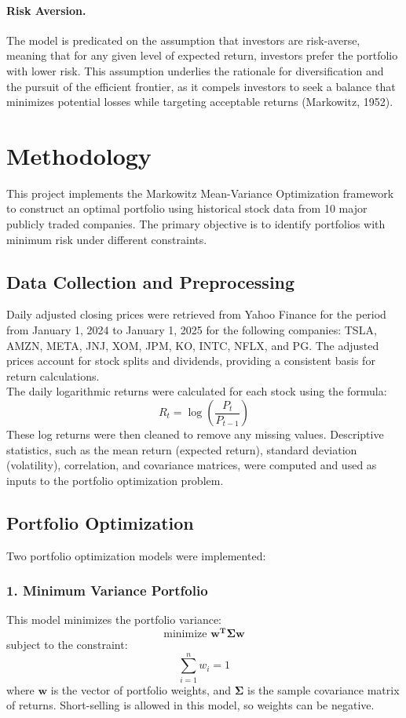 \documentclass[12pt]{article}
\begin{document}
\paragraph{Risk Aversion.} The model is predicated on the assumption that investors are risk-averse, meaning that for any given level of expected return, investors prefer the portfolio with lower risk. This assumption underlies the rationale for diversification and the pursuit of the efficient frontier, as it compels investors to seek a balance that minimizes potential losses while targeting acceptable returns (Markowitz, 1952).

\section{Methodology}
This project implements the Markowitz Mean-Variance Optimization framework to construct an optimal portfolio using historical stock data from 10 major publicly traded companies. The primary objective is to identify portfolios with minimum risk under different constraints.

\subsection*{Data Collection and Preprocessing}
Daily adjusted closing prices were retrieved from Yahoo Finance for the period from January 1, 2024 to January 1, 2025 for the following companies: TSLA, AMZN, META, JNJ, XOM, JPM, KO, INTC, NFLX, and PG. The adjusted prices account for stock splits and dividends, providing a consistent basis for return calculations. \\
The daily logarithmic returns were calculated for each stock using the formula:
\[R_t=\log \left (\frac{P_t}{P_{t-1}} \right )\]
These log returns were then cleaned to remove any missing values. Descriptive statistics, such as the mean return (expected return), standard deviation (volatility), correlation, and covariance matrices, were computed and used as inputs to the portfolio optimization problem.

\subsection*{Portfolio Optimization}
Two portfolio optimization models were implemented:

\subsubsection*{1. Minimum Variance Portfolio}
This model minimizes the portfolio variance:
\[\text{minimize } \mathbf{w^T\Sigma w}\]
subject to the constraint:
\[\sum_{i=1}^n w_i=1\]
where $\mathbf{w}$ is the vector of portfolio weights, and $\mathbf{\Sigma}$ is the sample covariance matrix of returns. Short-selling is allowed in this model, so weights can be negative.
\end{document}
